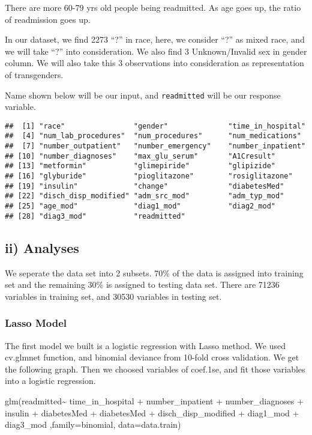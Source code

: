 \documentclass[]{article}
\begin{document}
There are more 60-79 yrs old people being readmitted. As age goes up,
the ratio of readmission goes up.

In our dataset, we find 2273 ``?'' in race, here, we consider ``?'' as
mixed race, and we will take ``?'' into consideration. We also find 3
Unknown/Invalid sex in gender column. We will also take this 3
observations into consideration as representation of transgenders.

Name shown below will be our input, and \texttt{readmitted} will be our
response variable.

\begin{verbatim}
##  [1] "race"                "gender"              "time_in_hospital"   
##  [4] "num_lab_procedures"  "num_procedures"      "num_medications"    
##  [7] "number_outpatient"   "number_emergency"    "number_inpatient"   
## [10] "number_diagnoses"    "max_glu_serum"       "A1Cresult"          
## [13] "metformin"           "glimepiride"         "glipizide"          
## [16] "glyburide"           "pioglitazone"        "rosiglitazone"      
## [19] "insulin"             "change"              "diabetesMed"        
## [22] "disch_disp_modified" "adm_src_mod"         "adm_typ_mod"        
## [25] "age_mod"             "diag1_mod"           "diag2_mod"          
## [28] "diag3_mod"           "readmitted"
\end{verbatim}

\subsection{ii) Analyses}\label{ii-analyses}

We seperate the data set into 2 subsets. 70\% of the data is assigned
into training set and the remaining 30\% is assigned to testing data
set. There are 71236 variables in training set, and 30530 variables in
testing set.

\subsubsection{Lasso Model}\label{lasso-model}

The first model we built is a logistic regression with Lasso method. We
used cv.glmnet function, and binomial deviance from 10-fold cross
validation. We get the following graph. Then we choosed variables of
coef.1se, and fit those variables into a logistic regression.

glm(readmitted\textasciitilde{} time\_in\_hospital + number\_inpatient +
number\_diagnoses + insulin + diabetesMed + diabetesMed +
disch\_disp\_modified + diag1\_mod + diag3\_mod ,family=binomial,
data=data.train)
\end{document}

